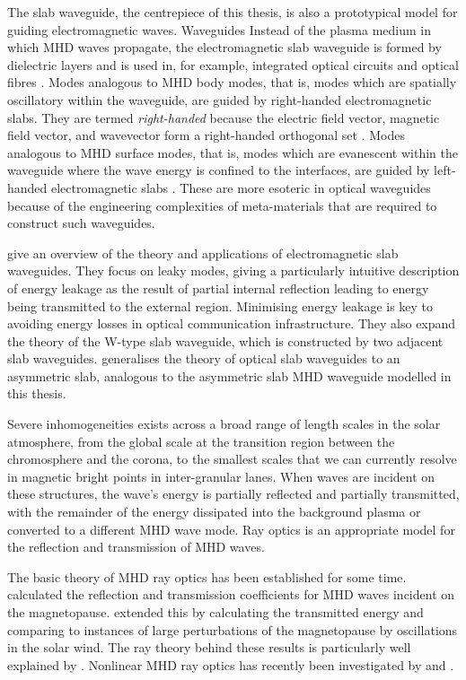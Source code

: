 	The slab waveguide, the centrepiece of this thesis, is also a prototypical model for guiding electromagnetic waves. Waveguides  Instead of the plasma medium in which MHD waves propagate, the electromagnetic slab waveguide is formed by dielectric layers and is used in, for example, integrated optical circuits and optical fibres \citep{ram_etal84}. Modes analogous to MHD body modes, that is, modes which are spatially oscillatory within the waveguide, are guided by right-handed electromagnetic slabs. They are termed \textit{right-handed} because the electric field vector, magnetic field vector, and wavevector form a right-handed orthogonal set \citep{ram_etal84}. Modes analogous to MHD surface modes, that is, modes which are evanescent within the waveguide where the wave energy is confined to the interfaces, are guided by left-handed electromagnetic slabs  \cite{wan_etal08,ash13,sha_etal03}. These are more esoteric in optical waveguides because of the engineering complexities of meta-materials that are required to construct such waveguides.
	
	\cite{Hu_etal09} give an overview of the theory and applications of electromagnetic slab waveguides. They focus on leaky modes, giving a particularly intuitive description of energy leakage as the result of partial internal reflection leading to energy being transmitted to the external region. Minimising energy leakage is key to avoiding energy losses in optical communication infrastructure. They also expand the theory of the W-type slab waveguide, which is constructed by two adjacent slab waveguides. \cite{mar74} generalises the theory of optical slab waveguides to an asymmetric slab, analogous to the asymmetric slab MHD waveguide modelled in this thesis.
	
	Severe inhomogeneities exists across a broad range of length scales in the solar atmosphere, from the global scale at the transition region between the chromosphere and the corona, to the smallest scales that we can currently resolve in magnetic bright points in inter-granular lanes. When waves are incident on these structures, the wave's energy is partially reflected and partially transmitted, with the remainder of the energy dissipated into the background plasma or converted to a different MHD wave mode. Ray optics is an appropriate model for the reflection and transmission of MHD waves.
	
	The basic theory of MHD ray optics has been established for some time. \cite{mck70} calculated the reflection and transmission coefficients for MHD waves incident on the magnetopause. \cite{ver73} extended this by calculating the transmitted energy and \cite{wol_etal75} comparing to instances of large perturbations of the magnetopause by oscillations in the solar wind. The ray theory behind these results is particularly well explained by \cite{wal04}. Nonlinear MHD ray optics has recently been investigated by \cite{nun18} and \cite{nun20}.
	

